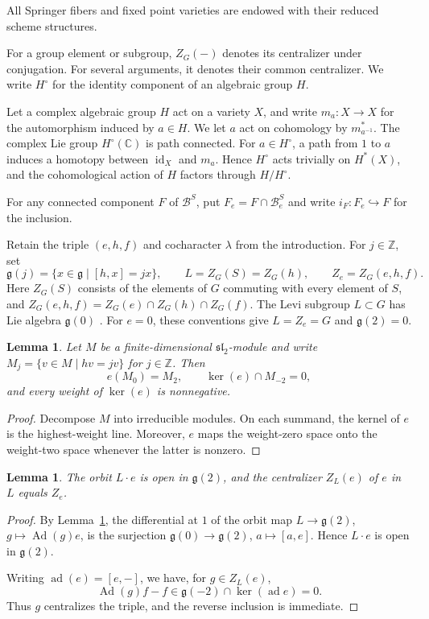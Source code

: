 \documentclass[12pt]{article}
\theoremstyle{paperplain}
\newtheorem{lemma}[theorem]{Lemma}
\DeclareMathOperator{\Ad}{Ad}
\DeclareMathOperator{\ad}{ad}
\newcommand{\C}{\mathbb C}
\newcommand{\Z}{\mathbb Z}
\newcommand{\g}{\mathfrak g}
\newcommand{\B}{\mathcal B}
\begin{document}
All Springer fibers and fixed point varieties are endowed with their reduced scheme structures.

For a group element or subgroup, $Z_G(-)$ denotes its centralizer under conjugation. For several arguments, it denotes their common centralizer. We write $H^\circ$ for the identity component of an algebraic group $H$.

Let a complex algebraic group $H$ act on a variety $X$, and write $m_a\colon X\to X$ for the automorphism induced by $a\in H$. We let $a$ act on cohomology by $m_{a^{-1}}^*$. The complex Lie group $H^\circ(\C)$ is path connected. For $a\in H^\circ$, a path from $1$ to $a$ induces a homotopy between $\operatorname{id}_X$ and $m_a$. Hence $H^\circ$ acts trivially on $H^*(X)$, and the cohomological action of $H$ factors through $H/H^\circ$.

For any connected component $F$ of $\B^S$, put $F_e=F\cap\B_e^S$ and write $i_F\colon F_e\hookrightarrow F$ for the inclusion.

Retain the triple $(e,h,f)$ and cocharacter $\lambda$ from the introduction. For $j\in\Z$, set
\[
    \g(j)=\{x\in\g\mid[h,x]=jx\},\qquad
    L=Z_G(S)=Z_G(h),\qquad Z_e=Z_G(e,h,f).
\]
Here $Z_G(S)$ consists of the elements of $G$ commuting with every element of $S$, and $Z_G(e,h,f)=Z_G(e)\cap Z_G(h)\cap Z_G(f)$. The Levi subgroup $L\subset G$ has Lie algebra $\g(0)$ \cite{Humphreys}. For $e=0$, these conventions give $L=Z_e=G$ and $\g(2)=0$.

\begin{lemma}\label{sl2}
    Let $M$ be a finite-dimensional $\mathfrak{sl}_2$-module and write $M_j=\{v\in M\mid hv=jv\}$ for $j\in\Z$. Then
    \[
        e(M_0)=M_2,\qquad \ker(e)\cap M_{-2}=0,
    \]
    and every weight of $\ker(e)$ is nonnegative.
\end{lemma}

\begin{proof}
    Decompose $M$ into irreducible modules. On each summand, the kernel of $e$ is the highest-weight line. Moreover, $e$ maps the weight-zero space onto the weight-two space whenever the latter is nonzero.
\end{proof}

\begin{lemma}\label{orbit}
    The orbit $L\cdot e$ is open in $\g(2)$, and the centralizer $Z_L(e)$ of $e$ in $L$ equals $Z_e$.
\end{lemma}

\begin{proof}
    By Lemma~\ref{sl2}, the differential at $1$ of the orbit map $L\to\g(2)$, $g\mapsto\Ad(g)e$, is the surjection $\g(0)\to\g(2)$, $a\mapsto[a,e]$. Hence $L\cdot e$ is open in $\g(2)$.

    Writing $\ad(e)=[e,-]$, we have, for $g\in Z_L(e)$,
    \[
        \Ad(g)f-f\in\g(-2)\cap\ker(\ad e)=0.
    \]
    Thus $g$ centralizes the triple, and the reverse inclusion is immediate.
\end{proof}
\end{document}
